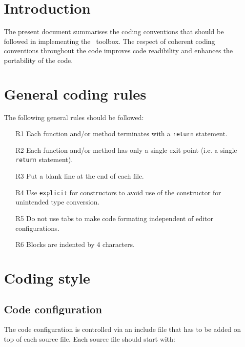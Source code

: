 \documentclass{article}[12pt,a4]
\begin{document}
\frontpage


\section{Introduction}

The present document summarises the coding conventions that should be
followed in implementing the \this\ toolbox.
The respect of coherent coding conventions throughout the code
improves code readibility and enhances the portability of the code.


\section{General coding rules}

The following general rules should be followed:
\begin{itemize}
\item[R1] Each function and/or method terminates with a {\tt return} statement.
\item[R2] Each function and/or method has only a single exit point (i.e. a single {\tt return} statement).
\item[R3] Put a blank line at the end of each file.
\item[R4] Use {\tt explicit} for constructors to avoid use of the constructor for unintended
type conversion.
\item[R5] Do not use tabs to make code formating independent of editor configurations.
\item[R6] Blocks are indented by 4 characters.
\end{itemize}


\section{Coding style}

\subsection{Code configuration}

The code configuration is controlled via an include file that has to be added on top of
each source file.
Each source file should start with:
\end{document}
